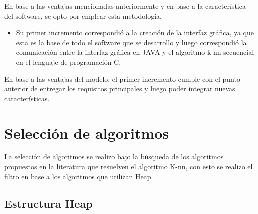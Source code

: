 En base a las ventajas mencionadas anteriormente y en base a la característica del software, se opto por emplear esta metodología. 
\begin{itemize}

\item Su primer incremento correspondió a la creación de la interfaz gráfica, ya que esta es la base de todo el software que se desarrollo y luego correspondió la comunicación entre la interfaz gráfica en JAVA y el algoritmo k-nn secuencial en el lenguaje de programación C. 
\end{itemize}

En base a las ventajas del modelo, el primer incremento cumple con el punto anterior de entregar los requisitos principales y luego poder integrar nuevas características.

\section{Selección de algoritmos}

La selección de algoritmos se realizo bajo la búsqueda de los algoritmos propuestos en la literatura que resuelven el algoritmo K-nn, con esto se realizo el filtro en base a los algoritmos que utilizan Heap.

\subsection*{Estructura Heap}\label{sec:heap}

